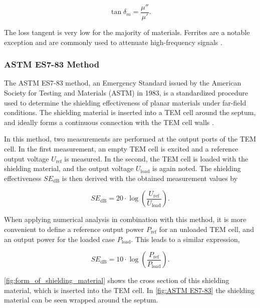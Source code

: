 \begin{equation}
	\tan{\delta_m}=\frac{\mu''}{\mu'}.
	\label{eqn:magnetic_loss_tangent}
\end{equation}

The loss tangent is very low for the majority of materials. Ferrites are a notable exception and are commonly used to attenuate high-frequency signals \cite[p.~80]{Balanis_2012}.

\subsubsection{ASTM ES7-83 Method}\label{sec:astm}

The ASTM ES7-83 method, an Emergency Standard issued by the American 
Society for Testing and Materials (ASTM) in 1983, is a standardized 
procedure used to determine the shielding effectiveness of planar 
materials under far-field conditions. The shielding material is inserted 
into a TEM cell around the septum, and ideally forms a continuous 
connection with the TEM cell walls \cite{MORARI_BĂLAN_2015}.

In this method, two measurements are performed at the output ports of the TEM cell. In the first measurement, an empty TEM cell is excited and a reference output voltage $U_\mathrm{ref}$ is measured. In the second, the TEM cell is loaded with the shielding material, and the output voltage $U_\mathrm{load}$ is again noted. The shielding effectiveness $SE_\mathrm{dB}$ is then derived with the obtained measurement values by \cite{MORARI_BĂLAN_2015}


\begin{equation}
	SE_\mathrm{dB}=20\cdot\log{\left(\frac{U_\mathrm{ref}}{U_\mathrm{load}}\right)}.
	\label{eqn:SE_voltages}
\end{equation}

When applying numerical analysis in combination with this method, it is more convenient to define a reference output power $P_\mathrm{ref}$ for an unloaded TEM cell, and an output power for the loaded case $P_\mathrm{load}$. This leads to a similar expression, 

\begin{equation}
	SE_\mathrm{dB}=10\cdot\log{\left( \frac{P_\mathrm{ref}}{P_\mathrm{load}} \right)}.
	\label{eqn:SE_power}
\end{equation}

\autoref{fig:form_of_shielding_material} shows the cross section of this shielding material, which is inserted into the TEM cell. In \autoref{fig:ASTM ES7-83} the shielding material can be seen wrapped around the septum. 

